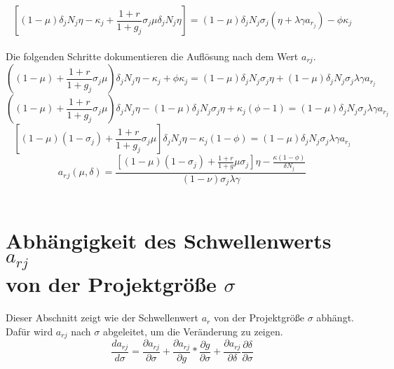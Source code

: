 \begin{equation}
\left [ (1-\mu) \delta_{j} N_{j} \eta - \kappa_{j} + \frac{1+r}{1+g_{j}} \sigma_{j} \mu \delta_{j}N_{j} \eta  \right ]= (1- \mu) \delta_{j} N_{j} \sigma_{j} (\eta + \lambda \gamma a_{r_{j}}) - \phi \kappa_{j}
\end{equation}
\\
Die folgenden Schritte dokumentieren die Auflösung nach dem Wert $a_{rj}$.
\begin{equation}
\left((1-\mu) +\frac{1+r}{1+g_{j}} \sigma_{j} \mu \right) \delta_{j} N_{j} \eta - \kappa_{j} + \phi \kappa_{j} = (1- \mu) \delta_{j} N_{j} \sigma_{j} \eta + (1- \mu) \delta_{j} N_{j} \sigma_{j} \lambda \gamma a_{r_{j}}
\end{equation}
\begin{equation}
\left((1-\mu) +\frac{1+r}{1+g_{j}} \sigma_{j} \mu \right) \delta_{j} N_{j} \eta - (1- \mu) \delta_{j} N_{j} \sigma_{j} \eta + \kappa_{j}( \phi -1)= (1- \mu) \delta_{j} N_{j} \sigma_{j} \lambda \gamma a_{r_{j}}
\end{equation}
\begin{equation}
\left [ (1- \mu) (1- \sigma _{j}) + \frac{1+r}{1+g_{j}} \sigma_{j} \mu \right ] \delta_{j} N_{j} \eta - \kappa_{j}(1- \phi) =(1- \mu) \delta_{j} N_{j} \sigma_{j} \lambda \gamma a_{r_{j}}
\end{equation}
\begin{equation} \boxed{
a_r{_j}(\mu,\delta)=\frac{[(1-\mu)(1-\sigma_j)+\frac{1+r}{1+g}\mu\sigma_j]\eta-\frac{\kappa(1-\phi)}{\delta N_j}}{(1-\nu)\sigma_j\lambda\gamma}}
 \end{equation}
\\


\section[Abhängigkeit des Schwellenwerts $a_{rj}$ von der Projektgrö{\ss}e $\sigma$]{Abhängigkeit des Schwellenwerts $a_{rj}$\\ von der Projektgrö{\ss}e $\sigma$ }\label{SchwellenwertAr}
Dieser Abschnitt zeigt wie der Schwellenwert $a_r$ von der Projektgrö{\ss}e $\sigma$ abhängt. Dafür wird $a_{rj}$ nach $\sigma$ abgeleitet, um die Veränderung zu zeigen.
\begin{equation}
\frac{da_{rj}}{d \sigma}= \frac{\partial a_{rj}}{\partial \sigma}+ \frac{\partial a_{rj}}{\partial g}*\frac{\partial g}{\partial \sigma} + \frac{\partial a_{rj}}{\partial \delta}\frac{\partial \delta}{\partial \sigma}
\end{equation}

